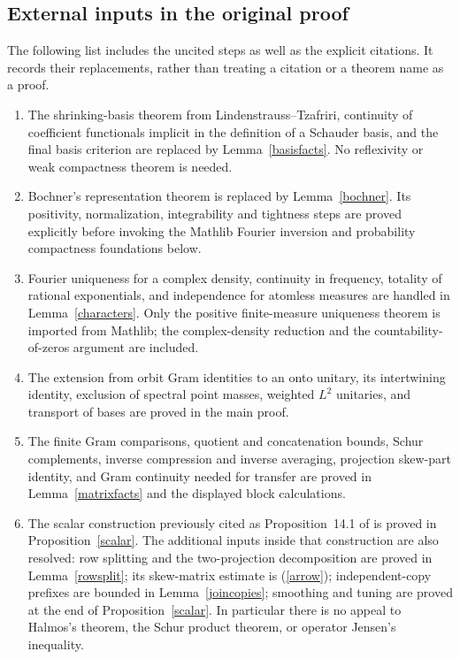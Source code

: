 \documentclass[reqno,a4paper,12pt]{amsart}
\begin{document}
\subsection{External inputs in the original proof}
The following list includes the uncited steps as well as the explicit
citations. It records their replacements, rather than treating a citation
or a theorem name as a proof.
\begin{enumerate}
\item The shrinking-basis theorem from Lindenstrauss--Tzafriri,
continuity of coefficient functionals implicit in the definition of a
Schauder basis, and the final basis criterion are replaced by
Lemma~\ref{basisfacts}. No reflexivity or weak compactness theorem is needed.
\item Bochner's representation theorem is replaced by
Lemma~\ref{bochner}. Its positivity, normalization, integrability and
tightness steps are proved explicitly before invoking the Mathlib
Fourier inversion and probability compactness foundations below.
\item Fourier uniqueness for a complex density, continuity in frequency,
totality of rational exponentials, and independence for atomless measures
are handled in Lemma~\ref{characters}. Only the positive finite-measure
uniqueness theorem is imported from Mathlib; the complex-density reduction
and the countability-of-zeros argument are included.
\item The extension from orbit Gram identities to an onto unitary,
its intertwining identity, exclusion of spectral point masses, weighted
$L^2$ unitaries, and transport of bases are proved in the main proof.
\item The finite Gram comparisons, quotient and concatenation bounds,
Schur complements, inverse compression and inverse averaging,
projection skew-part identity, and Gram continuity needed for transfer
are proved in Lemma~\ref{matrixfacts} and the displayed block calculations.
\item The scalar construction previously cited as Proposition~14.1 of
\cite{FLT} is proved in Proposition~\ref{scalar}. The additional inputs
inside that construction are also resolved: row splitting and the
two-projection decomposition are proved in Lemma~\ref{rowsplit}; its
skew-matrix estimate is (\ref{arrow}); independent-copy prefixes are
bounded in Lemma~\ref{joincopies}; smoothing and tuning are proved at
the end of Proposition~\ref{scalar}. In particular there is no appeal
to Halmos's theorem, the Schur product theorem, or operator Jensen's inequality.

\end{enumerate}
\end{document}
